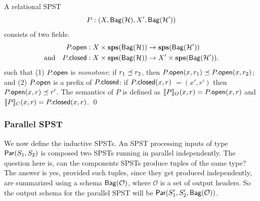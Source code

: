 \begin{definition}
A relational SPST
\[P : (X, \relleaf{\mathcal{H}}, X', \relleaf{\mathcal{H}'})\]
consists of two fields:
\begin{align*}
\spstfield{P}{open} &: X \times \sps(\relleaf{\mathcal{H}}) \to \sps(\relleaf{\mathcal{H}'}) \\
\text{and} \quad
\spstfield{P}{closed} &: X \times \sps(\relleaf{\mathcal{H}}) \to X' \times \sps(\relleaf{\mathcal{H}'}).
\end{align*}
such that
(1) $\spstfield{P}{open}$ is \emph{monotone}:
if $r_1 \prefix r_2$, then $\spstfield{P}{open}(x, r_1) \prefix \spstfield{P}{open}(x, r_2)$;
and
(2) $\spstfield{P}{open}$ is a prefix of $\spstfield{P}{closed}$:
if $\spstfield{P}{closed}(x, r)$ $= (x', r')$
then $\spstfield{P}{open}(x, r) \prefix r'$.
The semantics of $P$ is defined as
$\spstsemO{x}{r}{P} = \spstfield{P}{open}(x, r)$
and $\spstsemC{x}{r}{P} = \spstfield{P}{closed}(x, r)$.
\qed
\end{definition}

\subsubsection{Parallel SPST}

We now define the inductive SPSTs.
An SPST processing inputs of type
$\parcomp{\ss_1}{\ss_2}$ is composed two SPSTs running in parallel independently.
The question here is, can the components SPSTs produce tuples of the same type?
The answer is yes, provided such tuples, since they get produced independently,
are summarized using a schema $\relleaf{\mathcal{O}}$,
where $\mathcal{O}$ is a set of output headers.
So the output schema for the parallel SPST
will be $\parthree{\ss_1'}{\ss_2'}{\relleaf{\mathcal{O}}}$.

